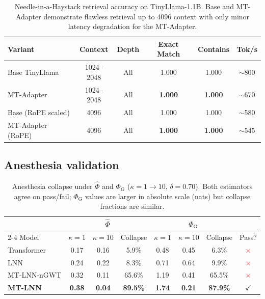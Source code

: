 \documentclass[11pt]{article}
\theoremstyle{definition}
\newcommand{\phihat}{\hat{\Phi}}
\newcommand{\phig}{\Phi_{\mathrm{G}}}
\begin{document}
\begin{table}[ht]
\centering
\caption{Needle-in-a-Haystack retrieval accuracy on TinyLlama-1.1B. Base and MT-Adapter demonstrate flawless retrieval up to 4096 context with only minor latency degradation for the MT-Adapter.}
\label{tab:needle}
\begin{tabular}{lccccc}
\toprule
Variant & Context & Depth & Exact Match & Contains & Tok/s \\
\midrule
Base TinyLlama & 1024--2048 & All & 1.000 & 1.000 & $\sim$800 \\
MT-Adapter & 1024--2048 & All & \textbf{1.000} & \textbf{1.000} & $\sim$670 \\
\midrule
Base (RoPE scaled) & 4096 & All & 1.000 & 1.000 & $\sim$580 \\
MT-Adapter (RoPE) & 4096 & All & \textbf{1.000} & \textbf{1.000} & $\sim$545 \\
\bottomrule
\end{tabular}
\end{table}

\subsection{Anesthesia validation}

\begin{table}[h]
\centering
\caption{Anesthesia collapse under $\phihat$ and $\phig$ ($\kappa=1\to10$, $\delta=0.70$). Both estimators agree on pass/fail; $\phig$ values are larger in absolute scale (nats) but collapse fractions are similar.}
\label{tab:anesth}
\begin{tabular}{lccccccc}
\toprule
 & \multicolumn{3}{c}{$\phihat$} & \multicolumn{3}{c}{$\phig$} & \\
\cmidrule{2-4}\cmidrule{5-7}
Model & $\kappa{=}1$ & $\kappa{=}10$ & Collapse & $\kappa{=}1$ & $\kappa{=}10$ & Collapse & Pass? \\
\midrule
Transformer  & 0.17 & 0.16 &  5.9\% & 0.48 & 0.45 &  6.3\% & \textcolor{red}{$\times$} \\
LNN          & 0.24 & 0.22 &  8.3\% & 0.71 & 0.64 &  9.9\% & \textcolor{red}{$\times$} \\
MT-LNN-nGWT  & 0.32 & 0.11 & 65.6\% & 1.19 & 0.41 & 65.5\% & \textcolor{red}{$\times$} \\
\textbf{MT-LNN} & \textbf{0.38} & \textbf{0.04} & \textbf{89.5\%} & \textbf{1.74} & \textbf{0.21} & \textbf{87.9\%} & \textcolor{green!60!black}{$\checkmark$} \\
\bottomrule
\end{tabular}
\end{table}
\end{document}
